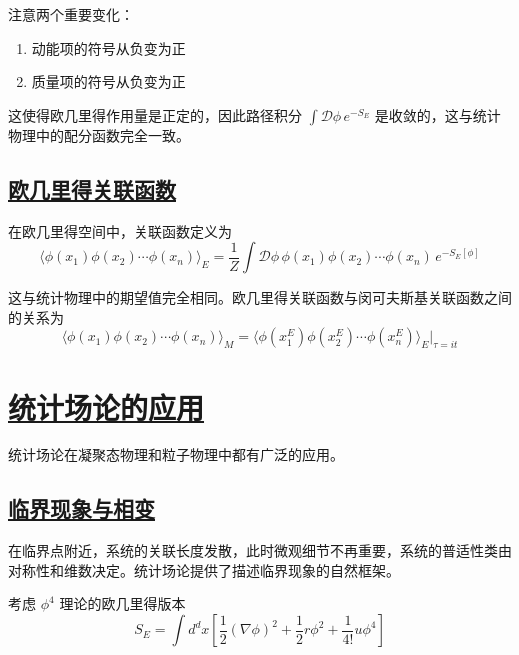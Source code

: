 注意两个重要变化：
\begin{enumerate}
    \item 动能项的符号从负变为正
    \item 质量项的符号从负变为正
\end{enumerate}

这使得欧几里得作用量是正定的，因此路径积分 $\int \mathcal{D}\phi \, e^{-S_E}$ 是收敛的，这与统计物理中的配分函数完全一致。

\subsection{\protect\hyperlink{:}{欧几里得关联函数}}

在欧几里得空间中，关联函数定义为
\begin{equation}
    \langle\phi(x_1)\phi(x_2)\cdots\phi(x_n)\rangle_E = \frac{1}{Z}\int \mathcal{D}\phi \, \phi(x_1)\phi(x_2)\cdots\phi(x_n) \, e^{-S_E[\phi]}
\end{equation}

这与统计物理中的期望值完全相同。欧几里得关联函数与闵可夫斯基关联函数之间的关系为
\begin{equation}
    \langle\phi(x_1)\phi(x_2)\cdots\phi(x_n)\rangle_M = \langle\phi(x_1^E)\phi(x_2^E)\cdots\phi(x_n^E)\rangle_E \Big|_{\tau = it}
\end{equation}

\section{\protect\hyperlink{:}{统计场论的应用}}

统计场论在凝聚态物理和粒子物理中都有广泛的应用。

\subsection{\protect\hyperlink{:}{临界现象与相变}}

在临界点附近，系统的关联长度发散，此时微观细节不再重要，系统的普适性类由对称性和维数决定。统计场论提供了描述临界现象的自然框架。

考虑 $\phi^4$ 理论的欧几里得版本
\begin{equation}
    S_E = \int d^d x \left[\frac{1}{2}(\nabla\phi)^2 + \frac{1}{2}r\phi^2 + \frac{1}{4!}u\phi^4\right]
\end{equation}

